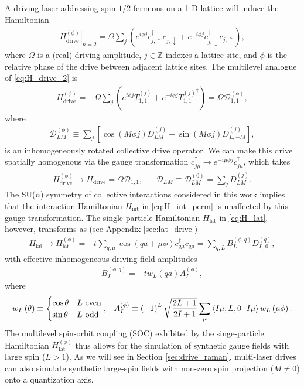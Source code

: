 \documentclass[nofootinbib,notitlepage,11pt]{revtex4-2}
\renewcommand{\t}{\text} %
\newcommand{\f}[2]{\dfrac{#1}{#2}} %
\newcommand{\p}[1]{\left(#1\right)} %
\renewcommand{\sp}[1]{\left[#1\right]} %
\newcommand{\bk}{\Braket} %
\newcommand{\1}{\mathds{1}}
\newcommand{\up}{\uparrow}
\newcommand{\dn}{\downarrow}
\newcommand{\D}{\mathcal{D}}
\begin{document}
A driving laser addressing spin-$1/2$ fermions on a 1-D lattice will
induce the Hamiltonian
\begin{align}
  \left. H_{\t{drive}}^{(\phi)} \right|_{n=2}
  = \Omega \sum_j
  \p{e^{i\phi j} c_{j,\up}^\dag c_{j,\dn}
    + e^{-i\phi j} c_{j,\dn}^\dag c_{j,\up}},
  \label{eq:H_drive_2}
\end{align}
where $\Omega$ is a (real) driving amplitude, $j\in\mathbb{Z}$ indexes
a lattice site, and $\phi$ is the relative phase of the drive between
adjacent lattice sites.  The multilevel analogue of
\eqref{eq:H_drive_2} is
\begin{align}
  H_{\t{drive}}^{(\phi)}
  = -\Omega \sum_j \p{e^{i\phi j} T_{1,1}^{(j)}
    + e^{-i\phi j} {T_{1,1}^{(j)}}^\dag}
  = \Omega \D_{1,1}^{(\phi)},
  \label{eq:H_drive}
\end{align}
where
\begin{align}
  \D_{LM}^{(\phi)}
  \equiv \sum_j \sp{\cos\p{M\phi j} D_{LM}^{(j)}
    - \sin\p{M\phi j} D_{L,-M}^{(j)}},
  \label{eq:drive_rot}
\end{align}
is an inhomogeneously rotated collective drive operator.  We can make
this drive spatially homogenous via the gauge transformation
$c_{j\mu}^\dag \to e^{-i\mu\phi j} c_{j\mu}^\dag$, which takes
 \begin{align}
  H_{\t{drive}}^{(\phi)} \to H_{\t{drive}} = \Omega \D_{1,1},
  &&
  \D_{LM} \equiv \D_{LM}^{(0)} = \sum_j D_{LM}^{(j)}.
\end{align}
The SU($n$) symmetry of collective interactions considered in this
work implies that the interaction Hamiltonian $H_{\t{int}}$ in
\eqref{eq:H_int_perm} is unaffected by this gauge transformation.  The
single-particle Hamiltonian $H_{\t{lat}}$ in \eqref{eq:H_lat},
however, transforms as (see Appendix \ref{sec:lat_drive})
\begin{align}
  H_{\t{lat}}
  \to H_{\t{lat}}^{(\phi)}
  = -t \sum_{q,\mu} \cos\p{qa+\mu\phi} c_{q\mu}^\dag c_{q\mu}
  = \sum_{q,L} B_L^{(\phi,q)} D_{L,0}^{(q)},
  \label{eq:H_lat_SOC_B}
\end{align}
with effective inhomogeneous driving field amplitudes
\begin{align}
  B_L^{(\phi,q)} = -t w_L\p{qa} A_L^{(\phi)},
\end{align}
where
\begin{align}
  w_L\p{\theta} \equiv
  \begin{cases}
    \cos\theta & L~\t{even} \\
    \sin\theta & L~\t{odd}
  \end{cases},
  &&
  A_L^{(\phi)} \equiv \p{-1}^L \sqrt{\f{2L+1}{2I+1}}
  \sum_\mu \bk{I\mu;L,0|I\mu} w_L\p{\mu\phi}.
  \label{eq:A_L_phi}
\end{align}
The multilevel spin-orbit coupling (SOC) exhibited by the
singe-particle Hamiltonian $H_{\t{lat}}^{(\phi)}$ thus allows for the
simulation of synthetic gauge fields with large spin ($L>1$).  As we
will see in Section \ref{sec:drive_raman}, multi-laser drives can also
simulate synthetic large-spin fields with non-zero spin projection
($M\ne0$) onto a quantization axis.
\end{document}
